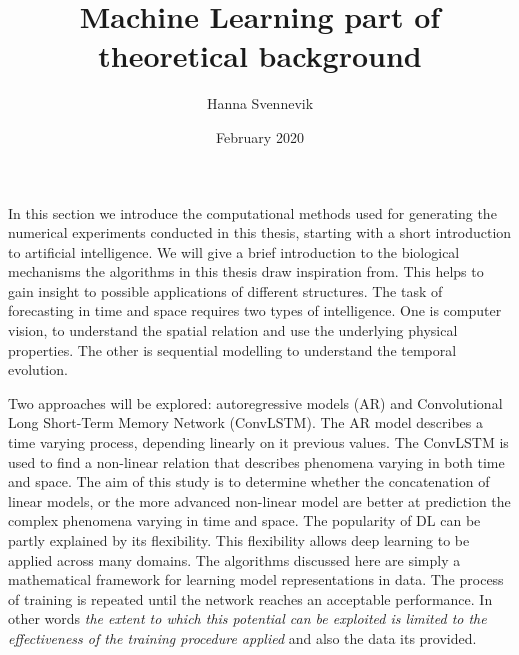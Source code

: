 \documentclass{article}
\title{Machine Learning part of theoretical background}
\author{Hanna Svennevik}
\date{February 2020}
\begin{document}
\maketitle
In this section we introduce the computational methods used for generating the numerical experiments conducted in this thesis, starting with a short introduction to artificial intelligence. We will give a brief introduction to the biological mechanisms the algorithms in this thesis draw inspiration from. This helps to gain insight to possible applications of different structures. 
The task of forecasting in time and space requires two types of intelligence. One is computer vision, to understand the spatial relation and use the underlying physical properties. The other is sequential modelling to understand the temporal evolution.

Two approaches will be explored: autoregressive models (AR) and Convolutional Long Short-Term Memory Network (ConvLSTM). The AR model describes a time varying process, depending linearly on it previous values. The ConvLSTM is used to find a non-linear relation that describes phenomena varying in both time and space. %
The aim of this study is to determine whether the concatenation of linear models, or the more advanced non-linear model are better at prediction the complex phenomena varying in time and space.
The popularity of DL can be partly explained by its flexibility. This flexibility allows deep learning to be applied across many domains. The algorithms discussed here are simply a mathematical framework for learning model representations in data. The process of training is repeated until the network reaches an acceptable performance. In other words \textit{the extent to which this potential can be exploited is limited to the effectiveness of the training procedure applied} and also the data its provided. 
\end{document}
